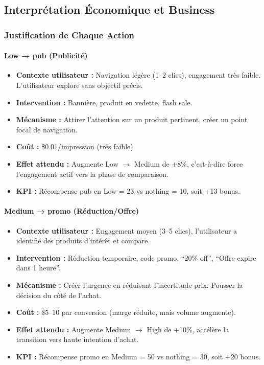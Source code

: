\documentclass[11pt,a4paper]{article}
\begin{document}
\subsection{Interprétation Économique et Business}
 
\subsubsection{Justification de Chaque Action}
 
\paragraph{Low → pub (Publicité)}
 
\begin{itemize}[leftmargin=1.5cm,itemsep=3pt]
  \item \textbf{Contexte utilisateur :} Navigation légère (1--2 clics), engagement très faible.
        L'utilisateur explore sans objectif précis.
  \item \textbf{Intervention :} Bannière, produit en vedette, flash sale.
  \item \textbf{Mécanisme :} Attirer l'attention sur un produit pertinent,
        créer un point focal de navigation.
  \item \textbf{Coût :} \$0.01/impression (très faible).
  \item \textbf{Effet attendu :} Augmente Low $\to$ Medium de +8\%, c'est-à-dire
        force l'engagement actif vers la phase de comparaison.
  \item \textbf{KPI :} Récompense pub en Low = 23 vs nothing = 10, soit +13 bonus.
\end{itemize}
 
\paragraph{Medium → promo (Réduction/Offre)}
 
\begin{itemize}[leftmargin=1.5cm,itemsep=3pt]
  \item \textbf{Contexte utilisateur :} Engagement moyen (3--5 clics),
        l'utilisateur a identifié des produits d'intérêt et compare.
  \item \textbf{Intervention :} Réduction temporaire, code promo, ``20\% off'',
        ``Offre expire dans 1 heure''.
  \item \textbf{Mécanisme :} Créer l'urgence en réduisant l'incertitude prix.
        Pousser la décision du côté de l'achat.
  \item \textbf{Coût :} \$5--10 par conversion (marge réduite, mais volume augmente).
  \item \textbf{Effet attendu :} Augmente Medium $\to$ High de +10\%,
        accélère la transition vers haute intention d'achat.
  \item \textbf{KPI :} Récompense promo en Medium = 50 vs nothing = 30, soit +20 bonus.
\end{itemize}
 
\end{document}
